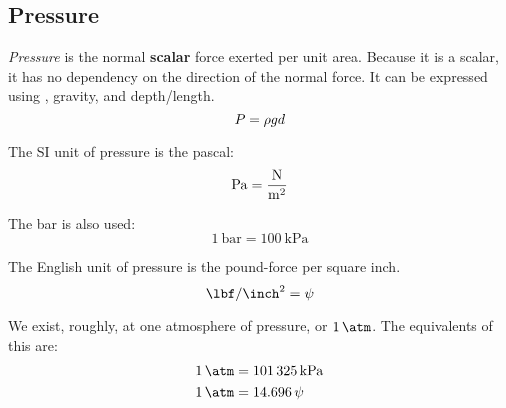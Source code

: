 \subsection{Pressure}\label{subsec:Pressure}
\begin{definition}[Pressure]\label{def:Pressure}
  \emph{Pressure} is the normal \textbf{scalar} force exerted per unit area.
  Because it is a scalar, it has no dependency on the direction of the normal force.
  It can be expressed using , gravity, and depth/length.
  \begin{equation}\label{eq:Pressure}
    P = \rho g d
  \end{equation}

  The SI unit of pressure is the pascal:
  \begin{equation}\label{eq:Pressure_Pascal}
    \si{\pascal} = \si[per-mode=fraction]{\newton\per\meter\squared}
  \end{equation}

  The bar is also used:
  \begin{equation*}
    \SI{1}{\bar} = \SI{100}{\kilo\pascal}
  \end{equation*}

  The English unit of pressure is the pound-force per square inch.
  \begin{equation}\label{eq:Pressure_Bar}
    \si[per-mode=symbol]{\lbf\per\inch\squared} = \si{\psi}
  \end{equation}
\end{definition}

We exist, roughly, at one atmosphere of pressure, or $\SI{1}{\atm}$.
The equivalents of this are:
\begin{align*}
  \SI{1}{\atm} &= \SI{101325}{\kilo\pascal} \\
  \SI{1}{\atm} &= \SI{14.696}{\psi}
\end{align*}



